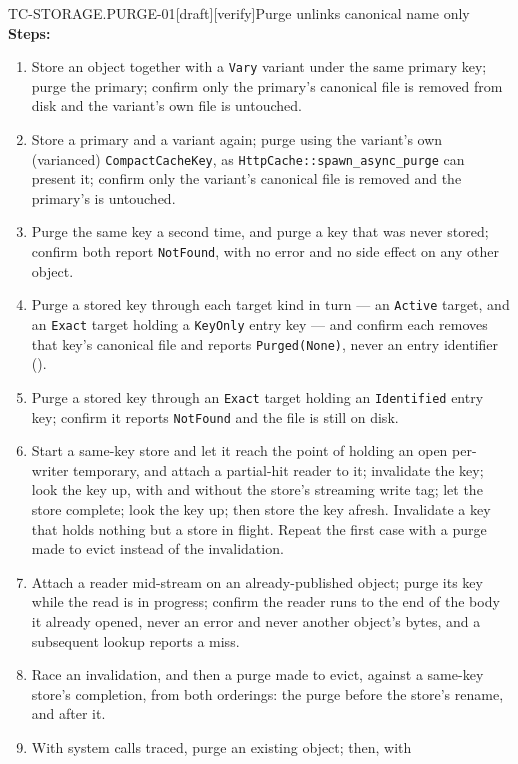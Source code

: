 \begin{requirement}{TC-STORAGE.PURGE-01}[draft][verify]{Purge unlinks canonical name only}
  \textbf{Steps:}
  \begin{enumerate}
    \item Store an object together with a \texttt{Vary} variant under the
      same primary key; purge the primary; confirm only the primary's
      canonical file is removed from disk and the variant's own file is
      untouched.
    \item Store a primary and a variant again; purge using the variant's
      own (varianced) \texttt{CompactCacheKey}, as
      \texttt{HttpCache::spawn\_async\_purge} can present it; confirm only
      the variant's canonical file is removed and the primary's is
      untouched.
    \item Purge the same key a second time, and purge a key that was never
      stored; confirm both report \texttt{NotFound}, with no error and no
      side effect on any other object.
    \item Purge a stored key through each target kind in turn --- an
      \texttt{Active} target, and an \texttt{Exact} target holding a
      \texttt{KeyOnly} entry key --- and confirm each removes that key's
      canonical file and reports \texttt{Purged(None)}, never an entry
      identifier ().
    \item Purge a stored key through an \texttt{Exact} target holding an
      \texttt{Identified} entry key; confirm it reports \texttt{NotFound}
      and the file is still on disk.
    \item Start a same-key store and let it reach the point of holding an
      open per-writer temporary, and attach a partial-hit reader to it;
      invalidate the key; look the key up, with and without the store's
      streaming write tag; let the store complete; look the key up; then
      store the key afresh. Invalidate a key that holds nothing but a store
      in flight. Repeat the first case with a purge made to evict instead of
      the invalidation.
    \item Attach a reader mid-stream on an already-published object; purge
      its key while the read is in progress; confirm the reader runs to
      the end of the body it already opened, never an error and never
      another object's bytes, and a subsequent lookup reports a miss.
    \item Race an invalidation, and then a purge made to evict, against a
      same-key store's completion, from both orderings: the purge before the
      store's rename, and after it.
    \item With system calls traced, purge an existing object; then, with

\end{enumerate}
\end{requirement}
